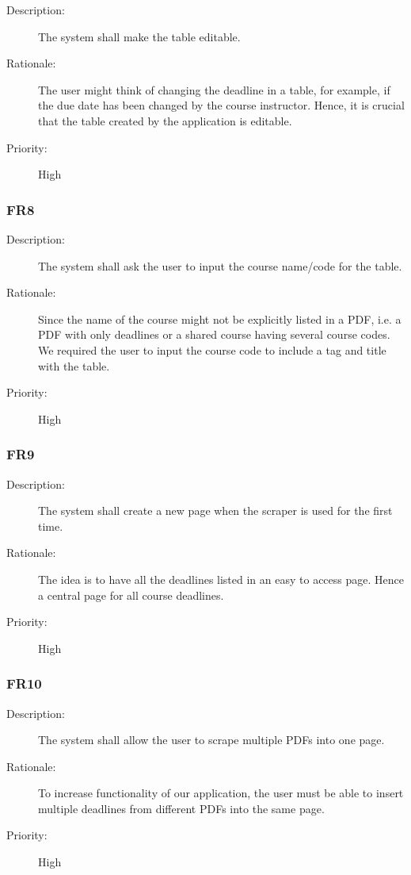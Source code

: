 \documentclass[12pt, titlepage]{article}
\begin{document}
\begin{description}
  \item[Description:] The system shall make the table editable. 
  \item[Rationale:] The user might think of changing the deadline in a table, for example, if the due date has been changed by the course instructor. Hence, it is crucial that the table created by the application is editable. 
  \item[Priority:] High
\end{description}

\subsubsection{FR8}

\begin{description}
  \item[Description:] The system shall ask the user to input the course name/code for the table. 
  \item[Rationale:] Since the name of the course might not be explicitly listed in a PDF, i.e. a PDF with only deadlines or a shared course having several course codes. We required the user to input the course code to include a tag and title with the table. 
  \item[Priority:] High
\end{description}

\subsubsection{FR9}

\begin{description}
  \item[Description:] The system shall create a new page when the scraper is used for the first time.  
  \item[Rationale:] The idea is to have all the deadlines listed in an easy to access page. Hence a central page for all course deadlines. 
  \item[Priority:] High
\end{description}

\subsubsection{FR10}

\begin{description}
  \item[Description:] The system shall allow the user to scrape multiple PDFs into one page. 
  \item[Rationale:] To increase functionality of our application, the user must be able to insert multiple deadlines from different PDFs into the same page. 
  \item[Priority:] High
\end{description}
\end{document}
